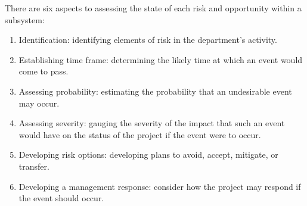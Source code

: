 There are six aspects to assessing the state of each risk and opportunity within a subsystem:
\begin{enumerate}
\item Identification:  identifying elements of risk in the department’s activity.
\item Establishing time frame:  determining the likely time at which an event would come to pass.
\item Assessing probability:  estimating the probability that an undesirable event may occur.
\item Assessing severity:  gauging the severity of the impact that such an event would have on the status of the project if the event were to occur.
\item Developing risk options:  developing plans to avoid, accept, mitigate, or transfer.
\item Developing a management response: consider how the project may respond if the event should occur.
\end{enumerate}
